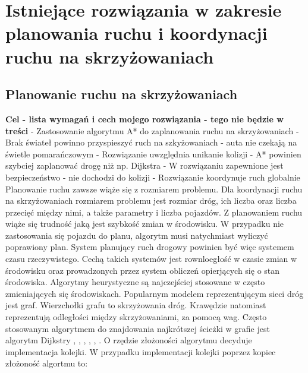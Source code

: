 \chapter{Istniejące rozwiązania w zakresie planowania ruchu i koordynacji ruchu na skrzyżowaniach} \label{chap:state-of-the-art}

\section{Planowanie ruchu na skrzyżowaniach}

\textbf{Cel - lista wymagań i cech mojego rozwiązania - tego nie będzie w treści}
\newline
- Zastosowanie algorytmu A* do zaplanowania ruchu na skrzyżowaniach
\newline
- Brak świateł powinno przyspieszyć ruch na szkyżowaniach - auta nie czekają na świetle pomarańczowym
\newline
- Rozwiązanie uwzględnia unikanie kolizji
\newline
- A* powinien szybciej zaplanować drogę niż np. Dijkstra
\newline
- W rozwiązaniu zapewnione jest bezpieczeństwo - nie dochodzi do kolizji
\newline
- Rozwiązanie koordynuje ruch globalnie
\newline
\newline
\newline
\newline
\indent
  Planowanie ruchu zawsze wiąże się z rozmiarem problemu. Dla koordynacji ruchu na skrzyżowaniach rozmiarem problemu jest rozmiar dróg, ich liczba oraz liczba przecięć między nimi, a także parametry i liczba pojazdów. Z planowaniem ruchu wiąże się trudność jaką jest szybkość zmian w środowisku. W przypadku nie zastosowania się pojazdu do planu, algorytm musi natychmiast wyliczyć poprawiony plan. System planujący ruch drogowy powinien być więc systemem czasu rzeczywistego. Cechą takich systemów jest rownloegłość w czasie zmian w środowisku oraz prowadzonych przez system obliczeń opierjących się o stan środowiska. Algorytmy heurystyczne są najczejściej stosowane w często zmieniających się środowiskach.
\newline
\indent
Popularnym modelem reprezentującym sieci dróg jest graf. Wierzchołki grafu to skrzyżowania dróg. Krawędzie natomiast reprezentują odległości między skrzyżowaniami, za pomocą wag. Często stosowanym algorytmem do znajdowania najkrótszej ścieżki w grafie jest algorytm Dijkstry \cite{shaikh2013agv}, \cite{ando2003autonomous}, \cite{huang2013improved}, \cite{gazis1997optimal}, \cite{broxmeyer1994vehicle}, \cite{kanoh2007dynamic}. O rzędzie złożoności algorytmu decyduje implementacja kolejki. W przypadku implementacji kolejki poprzez kopiec złożoność algortmu to:
